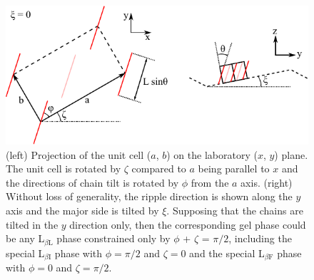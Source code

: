 \begin{figure}[htbp]
  \centering
  \includegraphics[width=\textwidth]{figures/ripple/thin_rod_model/unit_cell_combined}
  \caption[(left) Projection of the unit cell ($a$, $b$) on the laboratory ($x$, $y$) plane]
  {(left) Projection of the unit cell ($a$, $b$) on the laboratory ($x$, $y$) plane.  
  The unit cell is rotated by $\zeta$ compared to $a$ being parallel to $x$ and the 
  directions of chain tilt is rotated by $\phi$ from the $a$ axis. 
  (right) Without loss of generality, the ripple direction is shown along 
  the $y$ axis and the major side is tilted by $\xi$.  Supposing that the chains 
  are tilted in the $y$ direction only, then the corresponding gel phase could 
  be any L$_{\beta\text{L}}$ phase constrained only by 
  $\phi$ + $\zeta$ = $\pi/2$, including the 
  special L$_{\beta\text{I}}$ phase with $\phi=\pi/2$ and $\zeta=0$ and the 
  special L$_{\beta\text{F}}$ phase with $\phi=0$ and $\zeta=\pi/2$.}
  \label{fig:thin_rod_model}
\end{figure}

